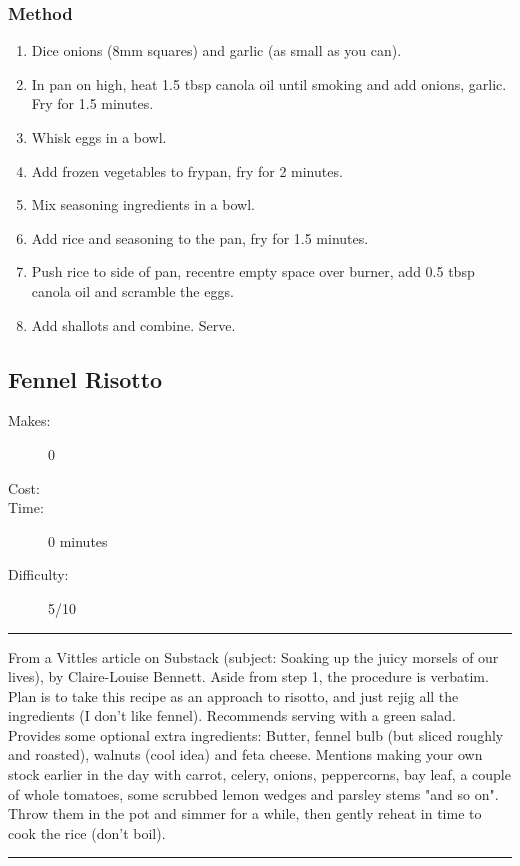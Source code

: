 \documentclass[]{article}
\begin{document}
\subsubsection*{\Large Method}
\begin{enumerate}[font=\huge\color{accent}]
	\item Dice onions (8mm squares) and garlic (as small as you can).
	\item In pan on high, heat 1.5 tbsp canola oil until smoking and add onions, garlic. Fry for 1.5 minutes.
	\item Whisk eggs in a bowl.
	\item Add frozen vegetables to frypan, fry for 2 minutes.
	\item Mix seasoning ingredients in a bowl.
	\item Add rice and seasoning to the pan, fry for 1.5 minutes.
	\item Push rice to side of pan, recentre empty space over burner, add 0.5 tbsp canola oil and scramble the eggs.
	\item Add shallots and combine. Serve.
\end{enumerate}
\newpage
{}\label{rec:Fennel Risotto}
\subsection*{\center\huge Fennel Risotto}
\begin{description}
\item[Makes:] 0 
\item[Cost:] \textdollar
\item[Time:] 0 minutes
\item[Difficulty:] 5/10
\end{description}
\vspace{0.2cm}\hrule\vspace{0.5cm}
\begin{adjustwidth}{0.5 cm}{0.5 cm}

From a Vittles article on Substack (subject: Soaking up the juicy morsels of our lives), by Claire-Louise Bennett. Aside from step 1, the procedure is verbatim. Plan is to take this recipe as an approach to risotto, and just rejig all the ingredients (I don't like fennel). Recommends serving with a green salad. Provides some optional extra ingredients: Butter, fennel bulb (but sliced roughly and roasted), walnuts (cool idea) and feta cheese. Mentions making your own stock earlier in the day with carrot, celery, onions, peppercorns, bay leaf, a couple of whole tomatoes, some scrubbed lemon wedges and parsley stems "and so on". Throw them in the pot and simmer for a while, then gently reheat in time to cook the rice (don't boil). \hfill\color{accent}{\Large\faVimeoSquare\hspace{0.1cm}\faGlide\hspace{0.1cm}}\color{black}

\end{adjustwidth}
\vspace{0.5cm}\hrule
\end{document}

